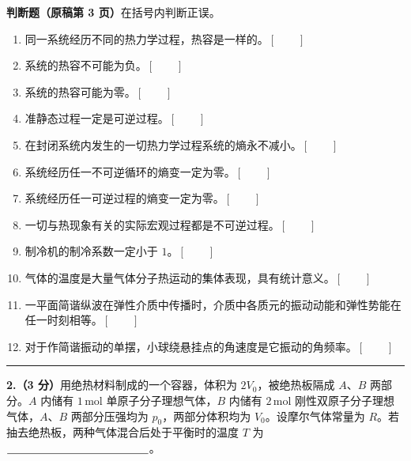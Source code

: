\documentclass[12pt,a4paper,UTF8]{ctexart}
\newcommand{\qitem}[1]{\par\needspace{5\baselineskip}\smallskip\noindent\textbf{#1}\hspace{0.5em}}
\newcommand{\fillblank}[1][2.6cm]{\rule[-0.48ex]{#1}{0.45pt}}
\newcommand{\tfbox}{\ensuremath{[\quad\quad]}}
\newcommand{\sourcepage}[1]{\par\medskip\noindent{\small\bfseries 原稿第 #1 页}\par\vspace{-0.2em}\hrule\smallskip}
\begin{document}
\noindent\textbf{判断题（原稿第 3 页）}\quad 在括号内判断正误。
\begin{enumerate}[label=\arabic*.,leftmargin=2.3em]
\item 同一系统经历不同的热力学过程，热容是一样的。\tfbox
\item 系统的热容不可能为负。\tfbox
\item 系统的热容可能为零。\tfbox
\item 准静态过程一定是可逆过程。\tfbox
\item 在封闭系统内发生的一切热力学过程系统的熵永不减小。\tfbox
\item 系统经历任一不可逆循环的熵变一定为零。\tfbox
\item 系统经历任一可逆过程的熵变一定为零。\tfbox
\item 一切与热现象有关的实际宏观过程都是不可逆过程。\tfbox
\item 制冷机的制冷系数一定小于 $1$。\tfbox
\item 气体的温度是大量气体分子热运动的集体表现，具有统计意义。\tfbox
\item 一平面简谐纵波在弹性介质中传播时，介质中各质元的振动动能和弹性势能在任一时刻相等。\tfbox
\item 对于作简谐振动的单摆，小球绕悬挂点的角速度是它振动的角频率。\tfbox
\end{enumerate}

\sourcepage{4}
\qitem{2.（3 分）}用绝热材料制成的一个容器，体积为 $2V_0$，被绝热板隔成 $A$、$B$ 两部分。$A$ 内储有 $1\,\mathrm{mol}$ 单原子分子理想气体，$B$ 内储有 $2\,\mathrm{mol}$ 刚性双原子分子理想气体，$A$、$B$ 两部分压强均为 $p_0$，两部分体积均为 $V_0$。设摩尔气体常量为 $R$。若抽去绝热板，两种气体混合后处于平衡时的温度 $T$ 为 $\fillblank[4.5cm]$。
\end{document}
